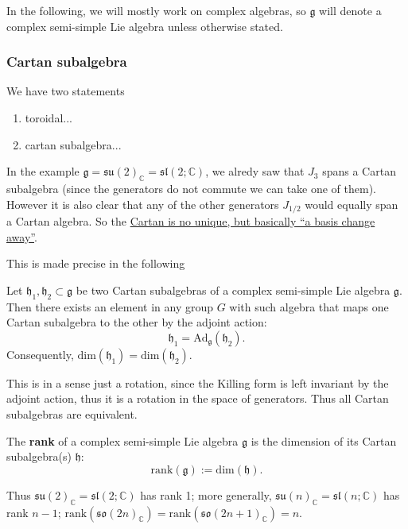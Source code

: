 In the following, we will mostly work on complex algebras, so \(\mathfrak{g}\) will denote a complex semi-simple Lie algebra unless otherwise stated.

\subsubsection{Cartan subalgebra}

\begin{definition}
    We have two statements
    \begin{enumerate}[label=(\roman*)]
        \item toroidal...
        \item cartan subalgebra...
    \end{enumerate}
\end{definition}

In the example \(\mathfrak{g} = \mathfrak{su}(2)_\mathbb{C} = \mathfrak{sl}(2; \mathbb{C})\), we alredy saw that \(J_3\) spans a Cartan subalgebra (since the generators do not commute we can take one of them). However it is also clear that any of the other generators \(J_{1/2}\) would equally span a Cartan algebra. So the \uline{Cartan is no unique, but basically “a basis change away”}.

This is made precise in the following
\begin{theorem}
    Let \(\mathfrak{h}_1, \mathfrak{h}_2 \subset \mathfrak{g}\) be two Cartan subalgebras of a complex semi-simple Lie algebra \(\mathfrak{g}\). Then there exists an element in any group \(G\) with such algebra that maps one Cartan subalgebra to the other by the adjoint action:
    \[
        \mathfrak{h}_1 = \mathrm{Ad}_\mathfrak{g} (\mathfrak{h}_2).
    \]
    Consequently, \(\mathrm{dim}(\mathfrak{h}_1) = \mathrm{dim}(\mathfrak{h}_2)\).
\end{theorem}
This is in a sense just a rotation, since the Killing form is left invariant by the adjoint action, thus it is a rotation in the space of generators. Thus all Cartan subalgebras are equivalent.

\begin{definition}
    The \textbf{rank} of a complex semi-simple Lie algebra \(\mathfrak{g}\) is the dimension of its Cartan subalgebra(s) \(\mathfrak{h}\):
    \[
        \mathrm{rank}(\mathfrak{g}) := \mathrm{dim}(\mathfrak{h}).
    \]
\end{definition}
Thus \(\mathfrak{su}(2)_\mathbb{C} = \mathfrak{sl}(2; \mathbb{C})\) has rank 1; more generally, \(\mathfrak{su}(n)_\mathbb{C} = \mathfrak{sl}(n; \mathbb{C})\) has rank \(n - 1\); \(\mathrm{rank}(\mathfrak{so}(2n)_\mathbb{C}) = \mathrm{rank}(\mathfrak{so}(2n + 1)_\mathbb{C}) = n\).

